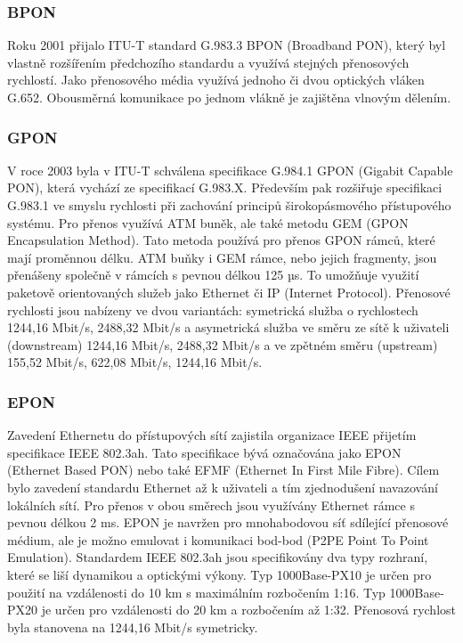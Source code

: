 \subsubsection{BPON}
Roku 2001 přijalo ITU-T standard G.983.3 BPON (Broadband PON), který byl vlastně rozšířením předchozího standardu a využívá stejných přenosových rychlostí. Jako přenosového média využívá jednoho či dvou optických vláken G.652. Obousměrná komunikace po jednom vlákně je zajištěna vlnovým dělením. 

\subsubsection{GPON}
V roce 2003 byla v ITU-T schválena specifikace G.984.1 GPON (Gigabit Capable PON), která vychází ze specifikací G.983.X. Především pak rozšiřuje specifikaci G.983.1 ve smyslu rychlosti při zachování principů širokopásmového přístupového systému. Pro přenos využívá ATM buněk, ale také metodu GEM (GPON Encapsulation Method). Tato metoda používá pro přenos GPON rámců, které mají proměnnou délku. ATM buňky i GEM rámce, nebo jejich fragmenty, jsou přenášeny společně v rámcích s pevnou délkou 125 µs. To umožňuje využití paketově orientovaných služeb jako Ethernet či IP (Internet Protocol). Přenosové rychlosti jsou nabízeny ve dvou variantách: symetrická služba o rychlostech 1244,16 Mbit/s, 2488,32 Mbit/s a asymetrická služba ve směru ze sítě k uživateli (downstream) 1244,16 Mbit/s, 2488,32 Mbit/s a ve zpětném směru (upstream) 155,52 Mbit/s, 622,08 Mbit/s, 1244,16 Mbit/s.

\subsubsection{EPON}
Zavedení Ethernetu do přístupových sítí zajistila organizace IEEE přijetím specifikace IEEE 802.3ah. Tato specifikace bývá označována jako EPON (Ethernet Based PON) nebo také EFMF (Ethernet In First Mile Fibre). Cílem bylo zavedení standardu Ethernet až k uživateli a tím zjednodušení navazování lokálních sítí. Pro přenos v obou směrech jsou využívány Ethernet rámce s pevnou délkou 2 ms. EPON je navržen pro mnohabodovou síť sdílející přenosové médium, ale je možno emulovat i komunikaci bod-bod (P2PE Point To Point Emulation). Standardem IEEE 802.3ah jsou specifikovány dva typy rozhraní, které se liší dynamikou a optickými výkony. Typ 1000Base-PX10 je určen pro použití na vzdálenosti do 10 km s maximálním rozbočením 1:16. Typ 1000Base-PX20 je určen pro vzdálenosti do 20 km a rozbočením až 1:32. Přenosová rychlost byla stanovena na 1244,16 Mbit/s symetricky.

